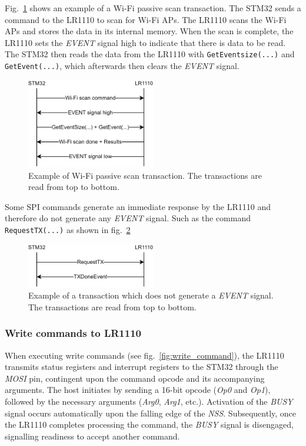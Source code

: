 Fig.~\ref{fig:event_example} shows an example of a Wi-Fi passive scan transaction. The STM32 sends a command to the LR1110 to scan for Wi-Fi \ac{AP}s. The LR1110 scans the Wi-Fi \ac{AP}s and stores the data in its internal memory. When the scan is complete, the LR1110 sets the \textit{EVENT} signal high to indicate that there is data to be read. The STM32 then reads the data from the LR1110 with \lstinline[style=C++]{GetEventsize(...)} and \lstinline[style=C++]{GetEvent(...)}, which afterwards then clears the \textit{EVENT} signal.

\begin{figure}[H]
    \centering
    \includegraphics[width=0.5\textwidth]{figures/event_example.png}
    \caption{Example of Wi-Fi passive scan transaction. The transactions are read from top to bottom.}
    \label{fig:event_example}
\end{figure}

Some \ac{SPI} commands generate an immediate response by the LR1110 and therefore do not generate any \textit{EVENT} signal. Such as the command \lstinline[style=C++]{RequestTX(...)} as shown in fig.~\ref{fig:event_example_2}

\begin{figure}[H]
    \centering
    \includegraphics[width=0.5\textwidth]{figures/event_example_2.png}
    \caption{Example of a transaction which does not generate a \textit{EVENT} signal. The transactions are read from top to bottom.}
    \label{fig:event_example_2}
\end{figure}

\subsubsection{Write commands to LR1110}
When executing write commands (see fig.~\ref{fig:write_command}), the LR1110 transmits status registers and interrupt registers to the STM32 through the \textit{MOSI} pin, contingent upon the command opcode and its accompanying arguments. The host initiates by sending a 16-bit opcode (\textit{Op0} and \textit{Op1}), followed by the necessary arguments (\textit{Arg0}, \textit{Arg1}, etc.). Activation of the \textit{BUSY} signal occurs automatically upon the falling edge of the \textit{NSS}. Subsequently, once the LR1110 completes processing the command, the \textit{BUSY} signal is disengaged, signalling readiness to accept another command.

